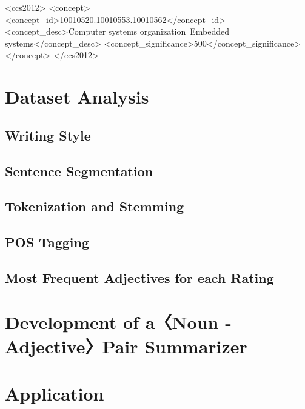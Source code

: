 \documentclass[sigchi]{acmart}
\begin{document}
	\begin{CCSXML}
		<ccs2012>
		<concept>
		<concept_id>10010520.10010553.10010562</concept_id>
		<concept_desc>Computer systems organization~Embedded systems</concept_desc>
		<concept_significance>500</concept_significance>
		</concept>
		</ccs2012>
	\end{CCSXML}
	

	
	
	
	\maketitle
	
	\section{Dataset Analysis}
	\subsection{Writing Style}
	\subsection{Sentence Segmentation}
	
	\subsection{Tokenization and Stemming}
	
	\subsection{POS Tagging}
	\subsection{Most Frequent Adjectives for each Rating}
	\section{Development of a〈Noun - Adjective〉Pair Summarizer}
	
	\section{Application}
	
\end{document}
